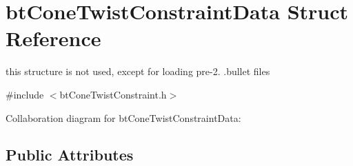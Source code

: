 \hypertarget{structbt_cone_twist_constraint_data}{\section{bt\+Cone\+Twist\+Constraint\+Data Struct Reference}
\label{structbt_cone_twist_constraint_data}
}


this structure is not used, except for loading pre-\/2. .bullet files  




{\ttfamily \#include $<$bt\+Cone\+Twist\+Constraint.\+h$>$}



Collaboration diagram for bt\+Cone\+Twist\+Constraint\+Data\+:
\subsection*{Public Attributes}
